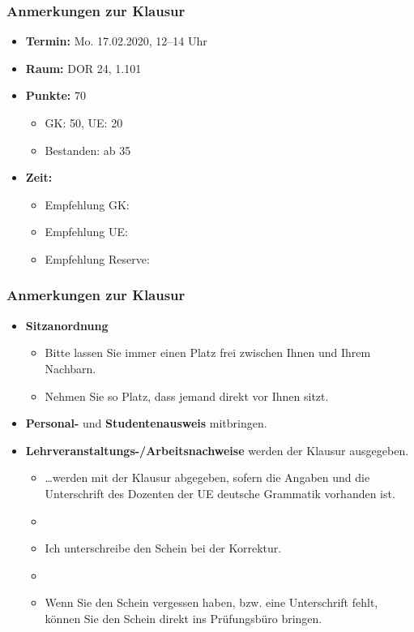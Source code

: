 \begin{frame}
\frametitle{Anmerkungen zur Klausur}

\begin{itemize}
	\item \textbf{Termin:} Mo. 17.02.2020, 12--14 Uhr
	
	\item \textbf{Raum:} DOR 24, 1.101

	\item \textbf{Punkte:} 70
	\begin{itemize}
		\item GK: 50, UE: 20
		\item Bestanden: ab 35
	\end{itemize}

	\item \textbf{Zeit:} 
	\begin{itemize}
		\item Empfehlung GK: 
		\item Empfehlung UE: 
		\item Empfehlung Reserve: 
	\end{itemize}		
\end{itemize}

\end{frame}


\begin{frame}
\frametitle{Anmerkungen zur Klausur}

\begin{itemize}

	\item \textbf{Sitzanordnung}
	\begin{itemize}
		\item Bitte lassen Sie immer einen Platz frei zwischen Ihnen und Ihrem Nachbarn.
		\item Nehmen Sie so Platz, dass jemand direkt vor Ihnen sitzt.
	\end{itemize}

	\item \textbf{Personal-} und \textbf{Studentenausweis} mitbringen.
	\item \textbf{Lehrveranstaltungs-/Arbeitsnachweise} werden der Klausur ausgegeben.
	\begin{itemize}
	
	 	\item \dots werden mit der Klausur abgegeben, sofern die Angaben und die Unterschrift des Dozenten der UE deutsche Grammatik vorhanden ist.
	 	\item[]
	 	\item Ich unterschreibe den Schein bei der Korrektur.
	 	\item[]
	 	\item Wenn Sie den Schein vergessen haben, bzw. eine Unterschrift fehlt, können Sie den Schein direkt ins Prüfungsbüro bringen.
	
	\end{itemize}
	
\end{itemize}

\end{frame}



